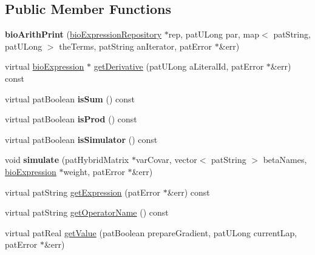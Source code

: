 \subsection*{Public Member Functions}
\begin{DoxyCompactItemize}
\item 
\mbox{\label{classbio_arith_print_aa2f7e9266af70a5b607230b4e0dd78ec}} 
{\bfseries bio\+Arith\+Print} (\hyperlink{classbio_expression_repository}{bio\+Expression\+Repository} $\ast$rep, pat\+U\+Long par, map$<$ pat\+String, pat\+U\+Long $>$ the\+Terms, pat\+String an\+Iterator, pat\+Error $\ast$\&err)
\item 
virtual \hyperlink{classbio_expression}{bio\+Expression} $\ast$ \hyperlink{classbio_arith_print_aa9f08ee87d538bb2c90497e4b50948e1}{get\+Derivative} (pat\+U\+Long a\+Literal\+Id, pat\+Error $\ast$\&err) const
\item 
\mbox{\label{classbio_arith_print_a33e4389d3563147e92ec8c94d6e40be6}} 
virtual pat\+Boolean {\bfseries is\+Sum} () const
\item 
\mbox{\label{classbio_arith_print_a2111fdbb86d2f43256bd9ba84eba9058}} 
virtual pat\+Boolean {\bfseries is\+Prod} () const
\item 
\mbox{\label{classbio_arith_print_a3ba4d45966f3de4a2902c113ab3ea7a5}} 
virtual pat\+Boolean {\bfseries is\+Simulator} () const
\item 
\mbox{\label{classbio_arith_print_a7ef938277148a1bc28d473a19a5ec624}} 
void {\bfseries simulate} (pat\+Hybrid\+Matrix $\ast$var\+Covar, vector$<$ pat\+String $>$ beta\+Names, \hyperlink{classbio_expression}{bio\+Expression} $\ast$weight, pat\+Error $\ast$\&err)
\item 
virtual pat\+String \hyperlink{classbio_arith_print_a7799066d3d3f68a685c89f46025f5aa8}{get\+Expression} (pat\+Error $\ast$\&err) const
\item 
virtual pat\+String \hyperlink{classbio_arith_print_a9451ac16baf5f060beafb2addb54a71e}{get\+Operator\+Name} () const
\item 
virtual pat\+Real \hyperlink{classbio_arith_print_a6c49bec841cdebd07ae234896c6d5416}{get\+Value} (pat\+Boolean prepare\+Gradient, pat\+U\+Long current\+Lap, pat\+Error $\ast$\&err)

\end{DoxyCompactItemize}
